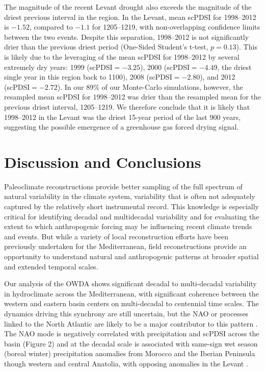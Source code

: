 \documentclass[draft,jgr]{AGUTeX}
\begin{document}
\begin{article}
\indent The magnitude of the recent Levant drought also exceeds the magnitude of the driest previous interval in the region. In the Levant, mean scPDSI for 1998--2012 is $-1.52$, compared to $-1.1$ for 1205--1219, with non-overlapping confidence limits between the two events. Despite this separation, 1998--2012 is not significantly drier than the previous driest period (One-Sided Student's t-test, $p=0.13$). This is likely due to the leveraging of the mean scPDSI for 1998--2012 by several extremely dry years: 1999 (scPDSI$=-3.25$), 2000 (scPDSI$=-4.49$, the driest single year in this region back to 1100), 2008 (scPDSI$=-2.80$), and 2012 (scPDSI$=-2.72$). In our 89\% of our Monte-Carlo simulations, however, the resampled mean scPDSI for 1998--2012 was drier than the resampled mean for the previous driest interval, 1205--1219. We therefore conclude that it is likely that 1998--2012 in the Levant was the driest 15-year period of the last 900 years, suggesting the possible emergence of a greenhouse gas forced drying signal.

\section{Discussion and Conclusions}
\noindent Paleoclimate reconstructions provide better sampling of the full spectrum of natural variability in the climate system, variability that is often not adequately captured by the relatively short instrumental record. This knowledge is especially critical for identifying decadal and multidecadal variability and for evaluating the extent to which anthropogenic forcing may be influencing recent climate trends and events. But while a variety of local reconstruction efforts have been previously undertaken for the Mediterranean, field reconstructions provide an opportunity to understand natural and anthropogenic patterns at broader spatial and extended temporal scales.

\indent Our analysis of the OWDA shows significant decadal to multi-decadal variability in hydroclimate across the Mediterranean, with significant coherence between the western and eastern basin centers on multi-decadal to centennial time scales. The dynamics driving this synchrony are still uncertain, but the NAO or processes linked to the North Atlantic are likely to be a major contributor to this pattern \citep{Hurrell:vanLoon1997,Eshel:Farrell2000}. The NAO mode is negatively correlated with precipitation and scPDSI across the basin (Figure 2) and at the decadal scale is associated with same-sign wet season (boreal winter) precipitation anomalies from Morocco and the Iberian Peninsula though western and central Anatolia, with opposing anomalies in the Levant \citep{Mariotti:etal2002,Xoplaki:etal2004}.


\end{article}
\end{document}
